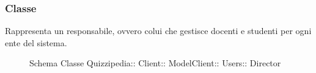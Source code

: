 \subsubsection{Classe }
Rappresenta un responsabile, ovvero colui che gestisce docenti e studenti per ogni ente del sistema.
\begin{figure}[H]
\centering
\noindent{}
\caption[Schema Classe Director]{Schema Classe Quizzipedia:: Client:: ModelClient:: Users:: Director}
\end{figure}
\begin{itemize}
\end{itemize}
